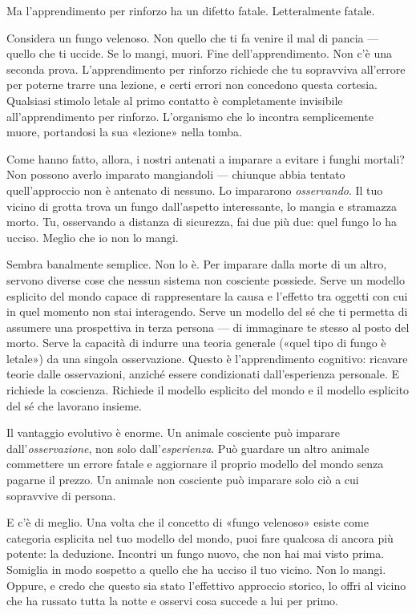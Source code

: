 \documentclass[11pt, twoside, openright]{book}
\begin{document}
Ma l'apprendimento per rinforzo ha un difetto fatale. Letteralmente fatale.

Considera un fungo velenoso. Non quello che ti fa venire il mal di pancia --- quello che ti uccide. Se lo mangi, muori. Fine dell'apprendimento. Non c'è una seconda prova. L'apprendimento per rinforzo richiede che tu sopravviva all'errore per poterne trarre una lezione, e certi errori non concedono questa cortesia. Qualsiasi stimolo letale al primo contatto è completamente invisibile all'apprendimento per rinforzo. L'organismo che lo incontra semplicemente muore, portandosi la sua «lezione» nella tomba.

Come hanno fatto, allora, i nostri antenati a imparare a evitare i funghi mortali? Non possono averlo imparato mangiandoli --- chiunque abbia tentato quell'approccio non è antenato di nessuno. Lo impararono \textit{osservando}. Il tuo vicino di grotta trova un fungo dall'aspetto interessante, lo mangia e stramazza morto. Tu, osservando a distanza di sicurezza, fai due più due: quel fungo lo ha ucciso. Meglio che io non lo mangi.

Sembra banalmente semplice. Non lo è. Per imparare dalla morte di un altro, servono diverse cose che nessun sistema non cosciente possiede. Serve un modello esplicito del mondo capace di rappresentare la causa e l'effetto tra oggetti con cui in quel momento non stai interagendo. Serve un modello del sé che ti permetta di assumere una prospettiva in terza persona --- di immaginare te stesso al posto del morto. Serve la capacità di indurre una teoria generale («quel tipo di fungo è letale») da una singola osservazione. Questo è l'apprendimento cognitivo: ricavare teorie dalle osservazioni, anziché essere condizionati dall'esperienza personale. E richiede la coscienza. Richiede il modello esplicito del mondo e il modello esplicito del sé che lavorano insieme.

Il vantaggio evolutivo è enorme. Un animale cosciente può imparare dall'\textit{osservazione}, non solo dall'\textit{esperienza}. Può guardare un altro animale commettere un errore fatale e aggiornare il proprio modello del mondo senza pagarne il prezzo. Un animale non cosciente può imparare solo ciò a cui sopravvive di persona.

E c'è di meglio. Una volta che il concetto di «fungo velenoso» esiste come categoria esplicita nel tuo modello del mondo, puoi fare qualcosa di ancora più potente: la deduzione. Incontri un fungo nuovo, che non hai mai visto prima. Somiglia in modo sospetto a quello che ha ucciso il tuo vicino. Non lo mangi. Oppure, e credo che questo sia stato l'effettivo approccio storico, lo offri al vicino che ha russato tutta la notte e osservi cosa succede a lui per primo.
\end{document}
